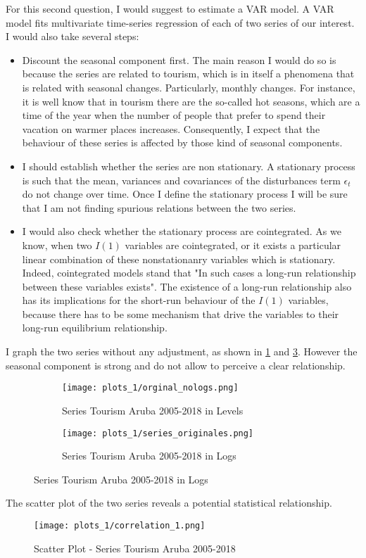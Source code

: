 \documentclass[11pt]{article}
\begin{document}
For this second question, I would suggest to estimate a VAR model. A VAR model fits multivariate time-series regression of each of two series of our interest.\\
I would also take several steps:
\begin{itemize}
    \item Discount the seasonal component first. The main reason I would do so is because the series are related to tourism, which is in itself a phenomena that is related with seasonal changes. Particularly, monthly changes. For instance, it is well know that in tourism there are the so-called hot seasons, which are a time of the year when the number of people that prefer to spend their vacation on warmer places increases. Consequently, I expect that the behaviour of these series is affected by those kind of seasonal components.
    \item I should establish whether the series are non stationary. A stationary process is such that the mean, variances and covariances of the disturbances term $\epsilon_t$ do not change over time. Once I define the stationary process I will be sure that I am not finding spurious relations between the two series. 
    \item I would also check whether the stationary process are cointegrated. As we know, when two $I(1)$ variables are cointegrated, or it exists a particular linear combination of these nonstationanry variables which is stationary. Indeed, cointegrated models stand that "In such cases a long-run relationship between these variables exists". The existence of a long-run relationship also has its implications for the short-run behaviour of the $I(1)$ variables, because there has to be some mechanism that drive the variables to their long-run equilibrium relationship.
\end{itemize}

I graph the two series without any adjustment, as shown in \ref{fig:behavriora} and \ref{fig:behavriorb}. However the seasonal component is strong and do not allow to perceive a clear relationship.
\begin{figure}[h!]
    \centering
    \begin{subfigure}[t]{0.45\textwidth}
         \texttt{[image: plots\_1/orginal\_nologs.png]}
         \caption{Series Tourism Aruba 2005-2018 in Levels}
         \label{fig:behavriora}
    \end{subfigure}
    \begin{subfigure}[t]{0.45\textwidth}
          \texttt{[image: plots\_1/series\_originales.png]}
          \caption{Series Tourism Aruba 2005-2018 in Logs}
    \label{fig:behavriorb}
    \end{subfigure}
\end{figure}
The scatter plot of the two series reveals a potential statistical relationship.
\begin{figure}[h!]
    \centering
     \texttt{[image: plots\_1/correlation\_1.png]}
     \caption{Scatter Plot - Series Tourism Aruba 2005-2018}
    \label{fig:scatter}
\end{figure}
\end{document}
